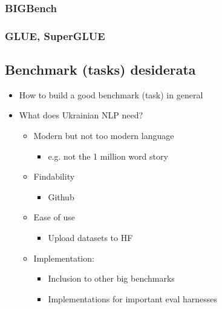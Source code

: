 \subsubsection{BIGBench}\label{bigbench}

\subsubsection{GLUE, SuperGLUE}\label{glue-superglue}

\subsection{Benchmark (tasks)
desiderata}\label{benchmark-tasks-desiderata}

\begin{itemize}
\tightlist
\item
  How to build a good benchmark (task) in general
\item
  What does Ukrainian NLP need?

  \begin{itemize}
  \tightlist
  \item
    Modern but not too modern language

    \begin{itemize}
    \tightlist
    \item
      e.g. not the 1 million word story
    \end{itemize}
  \item
    Findability

    \begin{itemize}
    \tightlist
    \item
      Github
    \end{itemize}
  \item
    Ease of use

    \begin{itemize}
    \tightlist
    \item
      Upload datasets to HF
    \end{itemize}
  \item
    Implementation:

    \begin{itemize}
    \item
      Inclusion to other big benchmarks
    \item
      Implementations for important eval harnesses
    \end{itemize}
  \end{itemize}
\end{itemize}

